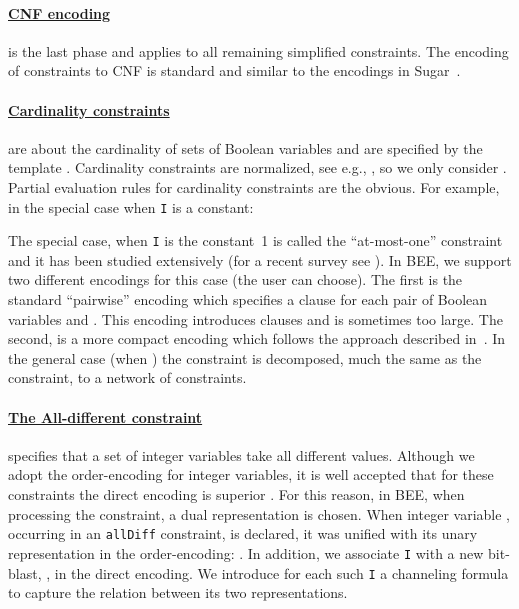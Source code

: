 \documentclass{tlp}
\newcommand{\bee}{\textsf{BEE}}
\begin{document}
\paragraph{\underline{CNF encoding}} is the last phase and applies to
all remaining simplified constraints. The encoding of constraints to
CNF is standard and similar to the encodings in
Sugar~\cite{sugar2009}.


\paragraph{\underline{Cardinality constraints}} are about the
cardinality of sets of Boolean variables and are specified by the
template .
Cardinality constraints are normalized, see e.g., \cite{EenS06}, so we
only consider . Partial evaluation rules
for cardinality constraints are the obvious. For example, in the
special case when \texttt{I} is a constant:







\medskip\noindent 
The special case, when \texttt{I} is the constant~1 is called the
``at-most-one'' constraint and it has been studied extensively (for a
recent survey see \cite{Frisch+Giannaros/10/SAT}). In \bee, we support
two different encodings for this case (the user can choose). The first
is the standard ``pairwise'' encoding which specifies a clause  for each pair of Boolean variables  and .
This encoding introduces  clauses and is sometimes too large.
The second,  is a more compact encoding which follows
the approach described in~\cite{NewAtMostOne}.
In the general case (when ) the constraint is
decomposed, much the same as the 
constraint, to a network of  constraints.

\paragraph{\underline{The All-different constraint}}
specifies that a set of integer variables take all different
values. Although we adopt the order-encoding for integer variables, it
is well accepted that for these constraints the direct encoding is
superior \cite{direct4allDiff}. For this reason, in \bee, when
processing the constraint, a dual representation is chosen.  When
integer variable , occurring in an \texttt{allDiff}
constraint, is declared, it was unified with its unary representation
in the order-encoding: . In addition, we
associate \texttt{I} with a new bit-blast,
, in the direct encoding.  We introduce
for each such \texttt{I} a channeling formula to capture the relation
between its two representations.
\end{document}
